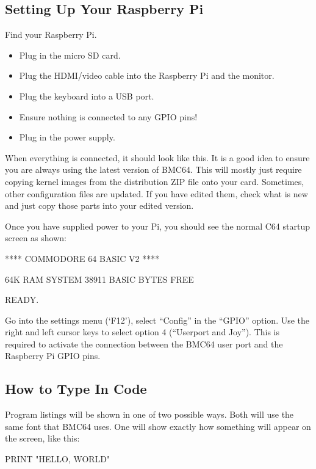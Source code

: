 \subsection*{Setting Up Your Raspberry Pi}


Find your Raspberry Pi.
\begin{itemize}
\item Plug in the micro SD card.
\item Plug the HDMI/video cable into the Raspberry Pi and the monitor.
\item Plug the keyboard into a USB port.
\item Ensure nothing is connected to any GPIO pins!
\item Plug in the power supply.
\end{itemize}

When everything is connected, it should look like this.  It is a good idea to ensure you are always using the latest version of BMC64.  This will mostly just require copying kernel images from the distribution ZIP file onto your card.  Sometimes, other configuration files are updated.  If you have edited them, check what is new and just copy those parts into your edited version.

Once you have supplied power to your Pi, you should see the normal C64 startup screen as shown:
\begin{code}

    **** COMMODORE 64 BASIC V2 ****

 64K RAM SYSTEM  38911 BASIC BYTES FREE

READY.
\end{code}

Go into the settings menu (`F12'), select ``Config'' in the ``GPIO'' option.  Use the right and left cursor keys to select option 4 (``Userport and Joy'').  This is required to activate the connection between the BMC64 user port and the Raspberry Pi GPIO pins.

\subsection*{How to Type In Code}

Program listings will be shown in one of two possible ways.  Both will use the same font that BMC64 uses.  One will show exactly how something will appear on the screen, like this:
\begin{code}
PRINT "HELLO, WORLD"
\end{code}

